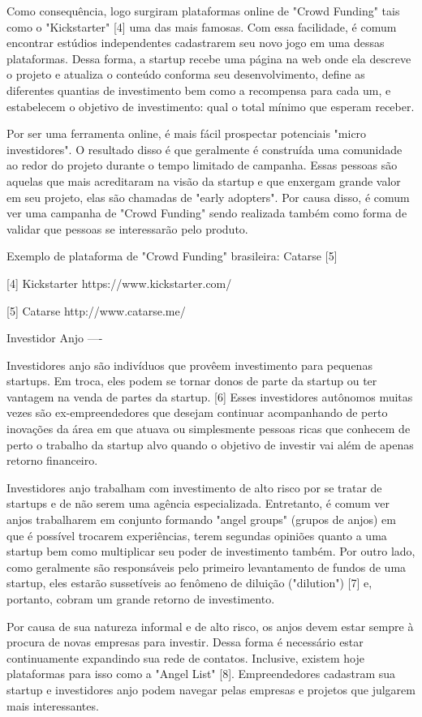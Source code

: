 Como consequência, logo surgiram plataformas online de "Crowd Funding" tais como o "Kickstarter" [4] uma das mais famosas. Com essa facilidade, é comum encontrar estúdios independentes cadastrarem seu novo jogo em uma dessas plataformas. Dessa forma, a startup recebe uma página na web onde ela descreve o projeto e atualiza o conteúdo conforma seu desenvolvimento, define as diferentes quantias de investimento bem como a recompensa para cada um, e estabelecem o objetivo de investimento: qual o total mínimo que esperam receber.

Por ser uma ferramenta online, é mais fácil prospectar potenciais "micro investidores". O resultado disso é que geralmente é construída uma comunidade ao redor do projeto durante o tempo limitado de campanha. Essas pessoas são aquelas que mais acreditaram na visão da startup e que enxergam grande valor em seu projeto, elas são chamadas de "early adopters". Por causa disso, é comum ver uma campanha de "Crowd Funding" sendo realizada também como forma de validar que pessoas se interessarão pelo produto.

Exemplo de plataforma de "Crowd Funding" brasileira: Catarse [5]

[4] Kickstarter
https://www.kickstarter.com/

[5] Catarse
http://www.catarse.me/


Investidor Anjo
----

Investidores anjo são indivíduos que provêem investimento para pequenas startups. Em troca, eles podem se tornar donos de parte da startup ou ter vantagem na venda de partes da startup. [6] Esses investidores autônomos muitas vezes são ex-empreendedores que desejam continuar acompanhando de perto inovações da área em que atuava ou simplesmente pessoas ricas que conhecem de perto o trabalho da startup alvo quando o objetivo de investir vai além de apenas retorno financeiro.

Investidores anjo trabalham com investimento de alto risco por se tratar de startups e de não serem uma agência especializada. Entretanto, é comum ver anjos trabalharem em conjunto formando "angel groups" (grupos de anjos) em que é possível trocarem experiências, terem segundas opiniões quanto a uma startup bem como multiplicar seu poder de investimento também. Por outro lado, como geralmente são responsáveis pelo primeiro levantamento de fundos de uma startup, eles estarão sussetíveis ao fenômeno de diluição ("dilution") [7] e, portanto, cobram um grande retorno de investimento.

Por causa de sua natureza informal e de alto risco, os anjos devem estar sempre à procura de novas empresas para investir. Dessa forma é necessário estar continuamente expandindo sua rede de contatos. Inclusive, existem hoje plataformas para isso como a "Angel List" [8]. Empreendedores cadastram sua startup e investidores anjo podem navegar pelas empresas e projetos que julgarem mais interessantes.

